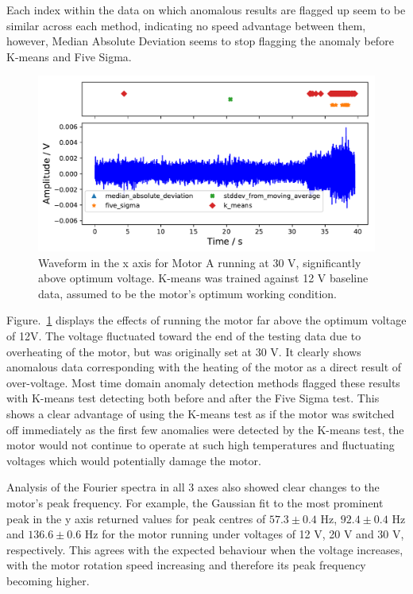 Each index within the data on which anomalous results are flagged up seem to be similar across each method, indicating no speed advantage between them, however, Median Absolute Deviation seems to stop flagging the anomaly before K-means and Five Sigma. %

\begin{figure}[t]
    \includegraphics[width=1.0\textwidth]{fig/large_30V_large_12V.pdf}
    \caption[Overvoltage of Large Motor]{Waveform in the x axis for Motor A running at 30 V, significantly above optimum voltage. K-means was trained against 12 V baseline data, assumed to be the motor's optimum working condition.}
    \label{fig:largemotor_30V}
\end{figure}

Figure.~\ref{fig:largemotor_30V} displays the effects of running the motor far above the optimum voltage of 12V. The voltage fluctuated toward the end of the testing data due to overheating of the motor, but was originally set at 30 V. It clearly shows anomalous data corresponding with the heating of the motor as a direct result of over-voltage. Most time domain anomaly detection methods flagged these results with K-means test detecting both before and after the Five Sigma test. This shows a clear advantage of using the K-means test as if the motor was switched off immediately as the first few anomalies were detected by the K-means test, the motor would not continue to operate at such high temperatures and fluctuating voltages which would potentially damage the motor.

Analysis of the Fourier spectra in all 3 axes also showed clear changes to the motor's peak frequency. For example, the Gaussian fit to the most prominent peak in the y axis returned values for peak centres of $57.3 \pm 0.4$ Hz, $92.4 \pm 0.4$ Hz and $136.6 \pm 0.6$ Hz for the motor running under voltages of 12 V, 20 V and 30 V, respectively. This agrees with the expected behaviour when the voltage increases, with the motor rotation speed increasing and therefore its peak frequency becoming higher.

